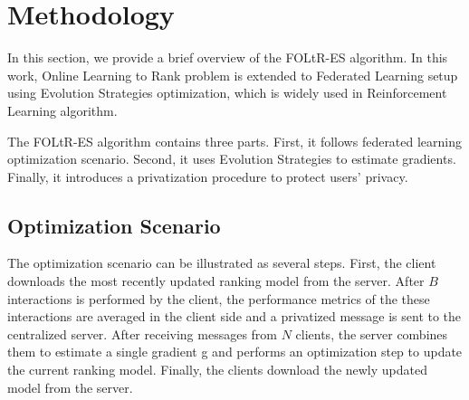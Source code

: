 
\section{Methodology}\label{sec:method}

In this section, we provide a brief overview of the FOLtR-ES algorithm. In this work, Online Learning to Rank problem is extended to Federated Learning setup using Evolution Strategies optimization, which is widely used in Reinforcement Learning algorithm.

The FOLtR-ES algorithm contains three parts. First, it follows federated learning optimization scenario. Second, it uses Evolution Strategies to estimate gradients. Finally, it introduces a privatization procedure to protect users' privacy.

\subsection{ Optimization Scenario}
The optimization scenario can be illustrated as several steps. First, the client downloads the most recently updated ranking model from the server. After $B$ interactions is performed by the client, the performance metrics of the these interactions are averaged in the client side and a privatized message is sent to the centralized server. After receiving messages from $N$ clients, the server combines them to estimate a single gradient g and performs an optimization step to update the current ranking model. Finally, the clients download the newly updated model from the server.

